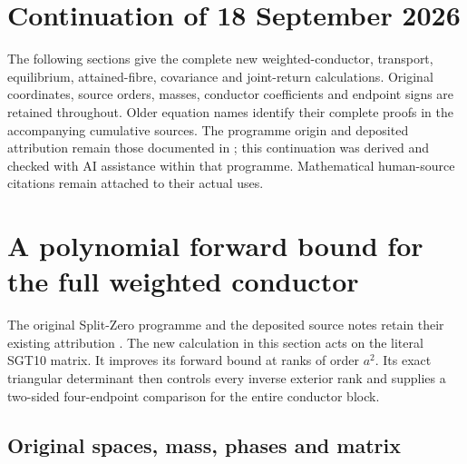 
\clearpage
\section*{Continuation of 18 September 2026}
The following sections give the complete new weighted-conductor,
transport, equilibrium, attained-fibre, covariance and joint-return
calculations. Original coordinates, source orders, masses, conductor
coefficients and endpoint signs are retained throughout. Older equation
names identify their complete proofs in the accompanying cumulative
sources. The programme origin and deposited attribution remain those
documented in \cite{human:globalization2026,human:splitzero2026}; this
continuation was derived and checked with AI assistance within that
programme. Mathematical human-source citations remain attached to their
actual uses.

\begingroup
\providecommand{\rank}{\operatorname{rank}}
\section{A polynomial forward bound for the full weighted conductor}
\label{sec:WCF}

The original Split-Zero programme and the deposited source notes retain
their existing attribution \cite{human:globalization2026,human:splitzero2026}.
The new calculation in this section acts on the literal SGT10 matrix. It
improves its forward bound at ranks of order $a^2$. Its exact triangular
determinant then controls every inverse exterior rank and supplies a
two-sided four-endpoint comparison for the entire conductor block.

\subsection{Original spaces, mass, phases and matrix}

